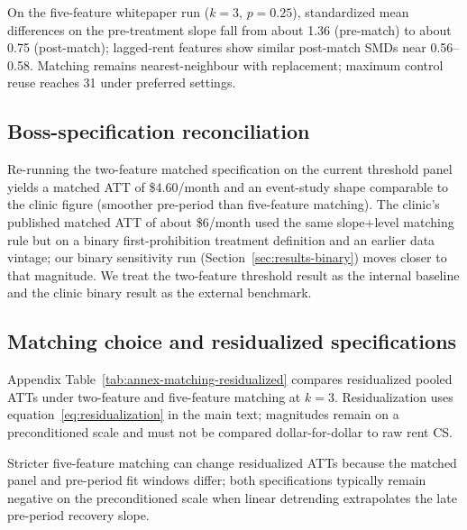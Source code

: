 On the five-feature whitepaper run ($k=3$, $p=0.25$), standardized mean differences on the pre-treatment slope fall from about 1.36 (pre-match) to about 0.75 (post-match); lagged-rent features show similar post-match SMDs near 0.56--0.58.
Matching remains nearest-neighbour with replacement; maximum control reuse reaches 31 under preferred settings.

\subsection{Boss-specification reconciliation}\label{app:boss-reconciliation}

Re-running the two-feature matched specification on the current threshold panel yields a matched ATT of \$4.60/month and an event-study shape comparable to the clinic figure (smoother pre-period than five-feature matching). The clinic's published matched ATT of about \$6/month used the same slope+level matching rule but on a binary first-prohibition treatment definition and an earlier data vintage; our binary sensitivity run (Section~\ref{sec:results-binary}) moves closer to that magnitude. We treat the two-feature threshold result as the internal baseline and the clinic binary result as the external benchmark.

\subsection{Matching choice and residualized specifications}\label{app:matching-residualized}

Appendix Table~\ref{tab:annex-matching-residualized} compares residualized pooled ATTs under two-feature and five-feature matching at $k=3$.
Residualization uses equation~\eqref{eq:residualization} in the main text; magnitudes remain on a preconditioned scale and must not be compared dollar-for-dollar to raw rent CS.

\begin{table}[htbp]
  \centering
  \caption{Matching $\times$ residualization interaction ($k=3$, $p=0.25$).}
  \label{tab:annex-matching-residualized}
  
\end{table}

Stricter five-feature matching can change residualized ATTs because the matched panel and pre-period fit windows differ; both specifications typically remain negative on the preconditioned scale when linear detrending extrapolates the late pre-period recovery slope.

